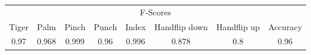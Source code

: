 \documentclass{standalone}
\begin{document}
 
 \begin{tabular}{|c|c|c|c|c|c|c ||c|}
\cline{1-8}\multicolumn{8}{|c|}{F-Scores} \\ 
\cline{1-8}Tiger & Palm & Pinch & Punch & Index & Handflip down & Handflip up & Accuracy\\ 
\cline{1-8}0.97 & 0.968 & 0.999 & 0.96 & 0.996 & 0.878 & 0.8 & 0.96\\ 
 \cline{1-8}\hline \end{tabular}
 
\end{document}
